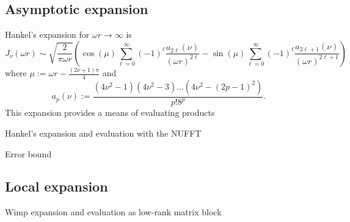 
\subsection{Asymptotic expansion}

Hankel's expansion for $\omega r \to \infty$ is
\begin{equation}
    J_\nu(\omega r)
    \sim \sqrt{\frac{2}{\pi\omega r}} \left( 
        \cos\left(\mu\right) \sum_{\ell=0}^\infty (-1)^\ell \frac{a_{2\ell}(\nu)}{(\omega r)^{2\ell}}
        - \sin\left(\mu\right) \sum_{\ell=0}^\infty (-1)^\ell \frac{a_{2\ell+1}(\nu)}{(\omega r)^{2\ell+1}}
        \right)
\end{equation}
where $\mu := \omega r - \frac{(2\nu+1)\pi}{4}$ and 
\begin{equation}
    a_p(\nu) := \frac{(4\nu^2 - 1)(4\nu^2 - 3)\dots(4\nu^2 - (2p-1)^2)}{p! 8^p}.
\end{equation}
This expansion provides a means of evaluating products 

Hankel's expansion and evaluation with the NUFFT

Error bound

\subsection{Local expansion}

Wimp expansion and evaluation as low-rank matrix block

